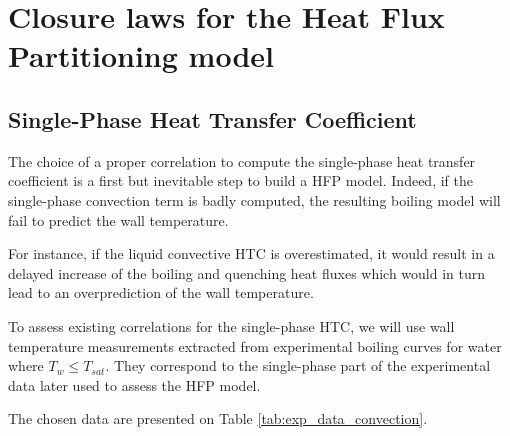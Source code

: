 
\chapter{Closure laws for the Heat Flux Partitioning model} %

\label{ch:HFP_closures} %



\section{Single-Phase Heat Transfer Coefficient}

The choice of a proper correlation to compute the single-phase heat transfer coefficient is a first but inevitable step to build a HFP model. Indeed, if the single-phase convection term is badly computed, the resulting boiling model will fail to predict the wall temperature.

For instance, if the liquid convective HTC is overestimated, it would result in a delayed increase of the boiling and quenching heat fluxes which would in turn lead to an overprediction of the wall temperature. 

To assess existing correlations for the single-phase HTC, we will use wall temperature measurements extracted from experimental boiling curves for water where $T_{w}\leq T_{sat}$. They correspond to the single-phase part of the experimental data later used to assess the HFP model.

The chosen data are presented on Table \ref{tab:exp_data_convection}.

